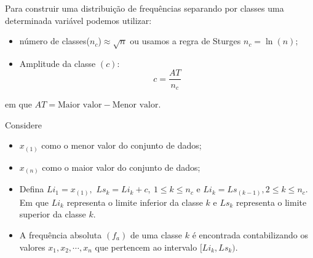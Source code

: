 \documentclass[12pt]{beamer}
\begin{document}
\begin{frame}{}
\frametitle{}
\begin{block}{}
\justifying
Para construir uma distribuição de frequências separando por classes uma determinada variável podemos utilizar:
\begin{itemize}
	\justifying
\item número de classes($n_{c}$)$\approx \sqrt{n}$ ou usamos a regra de Sturges $n_{c}=\ln{(n)};$\pause
\item Amplitude da classe $(c)$: $$c=\dfrac{AT}{n_{c}}$$ 
\end{itemize}
em que $AT=\textrm{Maior valor} - \textrm{Menor valor}.$
\end{block}
\end{frame}

\begin{frame}{}
\begin{block}{}
Considere
\begin{itemize}
    \item $x_{(1)}$ como o menor valor do conjunto de dados;
    \item $x_{(n)}$ como o maior valor do conjunto de dados; 
\end{itemize}
\end{block}
\vspace{-0.5cm}
\pause
\begin{block}{}
\begin{itemize}
	\justifying
\item Defina $Li_{1}=x_{(1)},$ $Ls_{k}=Li_{k}+c,\ 1\leq k \leq n_{c}$ e
$Li_{k}=Ls_{(k-1)},2 \leq k \leq n_{c}.$ Em que $Li_{k}$ representa o limite inferior da classe $k$ e $Ls_{k}$ representa o limite superior da classe $k.$\pause
\item A frequência absoluta $(f_{a})$ de uma classe $k$ é encontrada contabilizando os valores $x_{1},x_{2},\cdots,x_{n}$ que pertencem ao intervalo $[Li_{k},Ls_{k}).$
\end{itemize}
\end{block}
\nocite{Morettin09, Apostila, eric, montgomery2016, Bastos2025}
\end{frame}

\begin{frame}[allowframebreaks]
\frametitle{}
\printbibliography
\end{frame}
\end{document}
